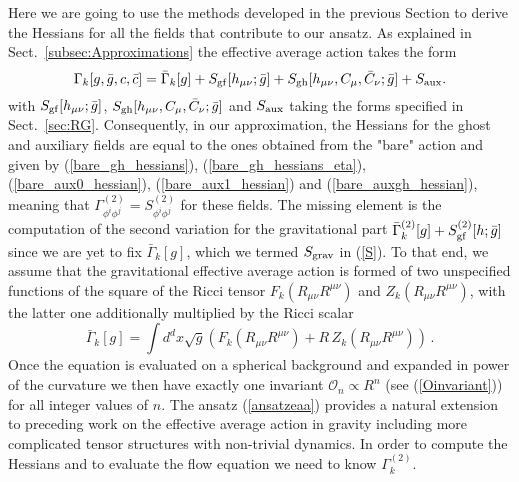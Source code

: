 \documentclass[notitlepage,eqsecnum,bm,amsmath,preprintnumbers,superscriptaddress,nofootinbib,aps,11pt]{revtex4-1}
\def\eq#1{(\ref{#1})}
\begin{document}
Here we are going to use the methods developed in the previous Section to derive the Hessians for all the fields that contribute to our 
ansatz. As explained in Sect.~\ref{subsec:Approximations} the effective average action takes the form
\begin{equation}
\Gamma_k[g,\bar g, c, \bar c]=\bar \Gamma_k[g]+S_{\rm gf}[h_{\mu\nu};\bar g]+S_{\rm gh}[h_{\mu\nu},C_\mu,\bar C_\nu;\bar g]  + S_{\rm aux}. \label{AnsatzRM}
\end{equation}
with $S_{\rm gf}[h_{\mu\nu};\bar g]$, $S_{\rm gh}[h_{\mu\nu},C_{\mu},\bar C_{\nu};\bar g]$ and $S_{\rm aux}$ taking the forms specified in Sect.~\ref{sec:RG}.
Consequently, in our approximation, the Hessians for the ghost and auxiliary fields are  equal to the ones obtained from the "bare" action and given by \eq{bare_gh_hessians},   \eq{bare_gh_hessians_eta}, \eq{bare_aux0_hessian}, \eq{bare_aux1_hessian}  and \eq{bare_auxgh_hessian}, meaning that $\Gamma^{(2)}_{\phi^i \phi^j} = S^{(2)}_{\phi^i \phi^j}$ for these fields. The missing element is the computation of the second variation for the gravitational part  $\bar \Gamma_k^{(2)}[g]+S_{\rm gf}^{(2)}[h;\bar g]$ since we are yet to fix $\bar \Gamma_k[g]$, which we termed $S_{\rm grav}$ in \eq{S}. To that end, we assume that the gravitational effective average action is formed of two unspecified functions of the square of the Ricci tensor  $F_k(R_{\mu\nu}R^{\mu\nu})$ and $Z_k(R_{\mu\nu}R^{\mu\nu})$, with the latter one additionally multiplied by the Ricci scalar
\begin{equation}\label{ansatzeaa}
\bar\Gamma_k[g]=\int d^dx
\sqrt{g}\left(F_k(R_{\mu\nu}R^{\mu\nu})+R\,Z_k(R_{\mu\nu}R^{\mu\nu})\right)\,.
\end{equation}
Once the equation is evaluated on a spherical background and expanded in power of the curvature we then have exactly one invariant $\mathcal{O}_n \propto R^n$ (see \eq{Oinvariant}) for all integer values of $n$. The ansatz \eq{ansatzeaa} provides a natural extension to preceding work on the effective average action in gravity including more complicated tensor structures with non-trivial dynamics.
In order to compute the Hessians and to evaluate the flow equation we need to know $\Gamma^{(2)}_k$. 
\end{document}
